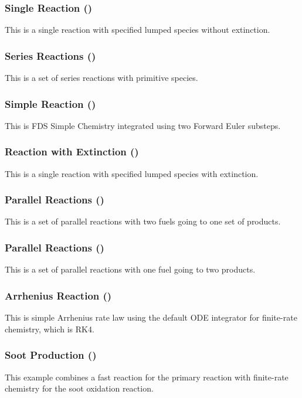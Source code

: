 \documentclass[11pt]{book}
\begin{document}
\subsubsection{Single Reaction ()} This is a single reaction with specified lumped species without extinction.

\subsubsection{Series Reactions ()} This is a set of series reactions with primitive species.

\subsubsection{Simple Reaction ()} This is FDS Simple Chemistry integrated using two Forward Euler substeps.

\subsubsection{Reaction with Extinction ()} This is a single reaction with specified lumped species with extinction.

\subsubsection{Parallel Reactions ()} This is a set of parallel reactions with two fuels going to one set of products.

\subsubsection{Parallel Reactions ()} This is a set of parallel reactions with one fuel going to two products.

\subsubsection{Arrhenius Reaction ()} This is simple Arrhenius rate law using the default ODE integrator for finite-rate chemistry, which is RK4.

\subsubsection{Soot Production ()} This example combines a fast reaction for the primary reaction with finite-rate chemistry for the soot oxidation reaction.
\end{document}
